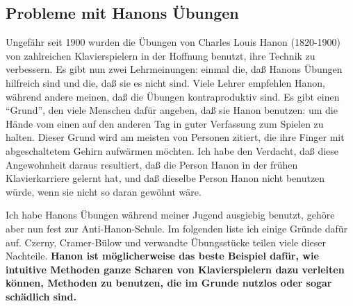 
\subsection{Probleme mit Hanons Übungen}\hypertarget{c1iii7h}{}

Ungefähr seit 1900 wurden die Übungen von Charles Louis Hanon (1820-1900) von zahlreichen Klavierspielern in der Hoffnung benutzt, ihre Technik zu verbessern.
Es gibt nun zwei Lehrmeinungen: einmal die, daß Hanons Übungen hilfreich sind und die, daß sie es nicht sind.
Viele Lehrer empfehlen Hanon, während andere meinen, daß die Übungen kontraproduktiv sind.
Es gibt einen \enquote{Grund}, den viele Menschen dafür angeben, daß sie Hanon benutzen: um die Hände vom einen auf den anderen Tag in guter Verfassung zum Spielen zu halten.
Dieser Grund wird am meisten von Personen zitiert, die ihre Finger mit abgeschaltetem Gehirn aufwärmen möchten.
Ich habe den Verdacht, daß diese Angewohnheit daraus resultiert, daß die Person Hanon in der frühen Klavierkarriere gelernt hat, und daß dieselbe Person Hanon nicht benutzen würde, wenn sie nicht so daran gewöhnt wäre.

Ich habe Hanons Übungen während meiner Jugend ausgiebig benutzt, gehöre aber nun fest zur Anti-Hanon-Schule.
Im folgenden liste ich einige Gründe dafür auf.
Czerny, Cramer-Bülow und verwandte Übungsstücke teilen viele dieser Nachteile.
\textbf{Hanon ist möglicherweise das beste Beispiel dafür, wie intuitive Methoden ganze Scharen von Klavierspielern  dazu verleiten können, Methoden zu benutzen, die im Grunde nutzlos oder sogar schädlich sind.}



